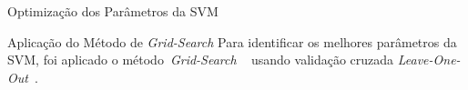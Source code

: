 \documentclass{beamer}
\begin{document}

\begin{frame}{Optimização dos Parâmetros da SVM}
 \begin{block}{Aplicação do Método de \textit{Grid-Search}}
 Para identificar os melhores parâmetros da SVM, foi aplicado o método~\textit{Grid-Search} ~\cite{gridsearchsvm2010} usando validação cruzada \textit{Leave-One-Out}~\cite{kantardzic2011data}.   
 \end{block}
\end{frame}









\end{document}
